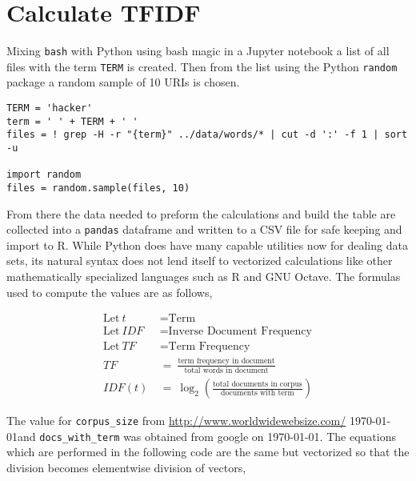 \documentclass[12pt, a4paper]{article}
\newcommand{\code}[1]{\texttt{#1}}
\begin{document}
\section{Calculate TFIDF}
Mixing \code{bash} with Python using bash magic in a Jupyter notebook a
list of all files with the term \code{TERM} is created. Then from the
list using the Python \code{random} package a random sample of 10 URIs
is chosen.

\begin{minipage}{\linewidth} %
\vspace{2em}
\begin{verbatim}
TERM = 'hacker'
term = ' ' + TERM + ' '
files = ! grep -H -r "{term}" ../data/words/* | cut -d ':' -f 1 | sort -u

import random
files = random.sample(files, 10)
\end{verbatim}
\vspace{2em}
\end{minipage}

From there the data needed to preform the calculations and build
the table are collected into a \code{pandas} dataframe and written
to a CSV file for safe keeping and import to R. While Python does
have many capable utilities now for dealing data sets, its natural
syntax does not lend itself to vectorized calculations like other
mathematically specialized languages such as R and GNU Octave.
The formulas used to compute the values are as follows,

\vspace{-2em}
\begin{align*}
\text{Let}\ t&=\text{Term}\\
\text{Let}\ IDF&=\text{Inverse Document Frequency}\\
\text{Let}\ TF&=\text{Term Frequency}\\[2em]
TF \:&=\: \frac{\text{term frequency in document}}{\text{total words in document}}\\[1em]
IDF(t) \:&=\: \log_2\left(\frac{\text{total documents in corpus}}{\text{documents with term}}\right)
\end{align*}

The value for \code{corpus\_size}
from \url{http://www.worldwidewebsize.com/} \today and 
\code{docs\_with\_term} was obtained from google on \today.
The equations which are performed in the following code are
the same but vectorized so that the division becomes elementwise
division of vectors,
\end{document}
